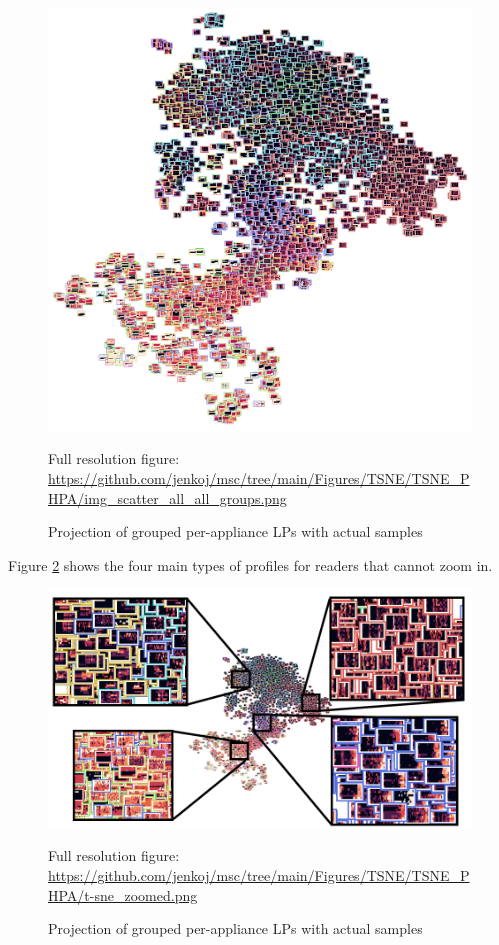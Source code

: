 \begin{figure}[H]  
	\centering
	\caption{Projection of grouped per-appliance LPs with actual samples}
	\includegraphics[width=.9\textwidth]{Figures/TSNE/TSNE_PHPA/img_scatter_all_all_groups.png}
	\label{fig:tsne_papb_img_scatter_all_groups}
	\par
	\par\footnotesize{Full resolution figure: \url{https://github.com/jenkoj/msc/tree/main/Figures/TSNE/TSNE_PHPA/img_scatter_all_all_groups.png}}
\end{figure}

Figure \ref{fig:t-sne_zoomed} shows the four main types of profiles for readers that cannot zoom in.

\begin{figure}[H] 
	\centering
	\caption{Projection of grouped per-appliance LPs with actual samples}
	\includegraphics[width=.9\textwidth]{Figures/TSNE/TSNE_PHPA/t-sne_zoomed.png}
	\label{fig:t-sne_zoomed}
	\par
	\par\footnotesize{Full resolution figure: \url{https://github.com/jenkoj/msc/tree/main/Figures/TSNE/TSNE_PHPA/t-sne_zoomed.png}}
\end{figure}

